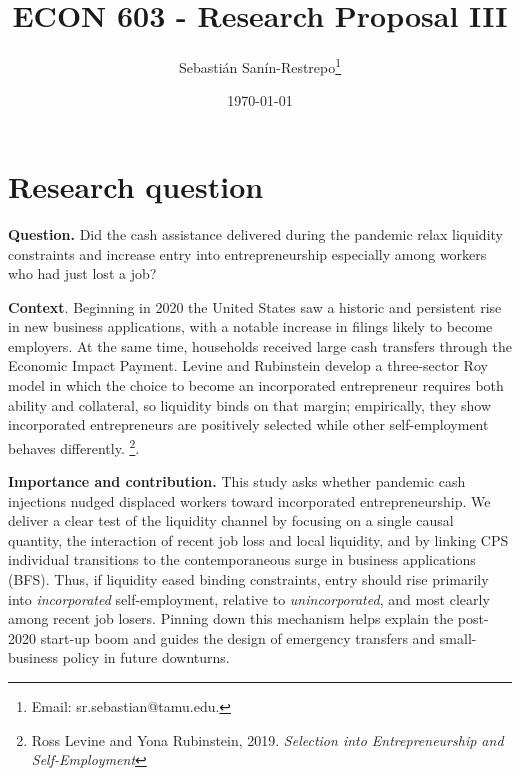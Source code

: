 



\title{\Large \textbf{ECON 603 - Research Proposal III}}

\author{Sebasti\'an San\'in-Restrepo\thanks{Email: sr.sebastian@tamu.edu.}} 
\date{\today}

\maketitle
\thispagestyle{empty} 
\doublespacing
\thispagestyle{empty} 

\vspace{-10mm}

\doublespacing

\section{ Research question}

\noindent \textbf{Question.} Did the cash assistance delivered during the pandemic relax liquidity constraints and increase entry into entrepreneurship especially among workers who had just lost a job?


\medskip
\noindent
\textbf{Context}. Beginning in 2020 the United States saw a historic and persistent rise in new business applications, with a notable increase in filings likely to become employers. At the same time, households received large cash transfers through the Economic Impact Payment. Levine and Rubinstein develop a three-sector Roy model in which the choice to become an incorporated entrepreneur requires both ability and collateral, so liquidity binds on that margin; empirically, they show incorporated entrepreneurs are positively selected while other self-employment behaves differently. \footnote{Ross Levine and Yona Rubinstein, 2019. \textit{Selection into Entrepreneurship and Self-Employment}}. 

\noindent \textbf{Importance and contribution.} This study asks whether pandemic cash injections nudged displaced workers toward incorporated entrepreneurship. We deliver a clear test of the liquidity channel by focusing on a single causal quantity, the interaction of recent job loss and local liquidity, and by linking CPS individual transitions to the contemporaneous surge in business applications (BFS). Thus, if liquidity eased binding constraints, entry should rise primarily into \textit{incorporated} self-employment, relative to \textit{unincorporated}, and most clearly among recent job losers. Pinning down this mechanism helps explain the post-2020 start-up boom and guides the design of emergency transfers and small-business policy in future downturns.

